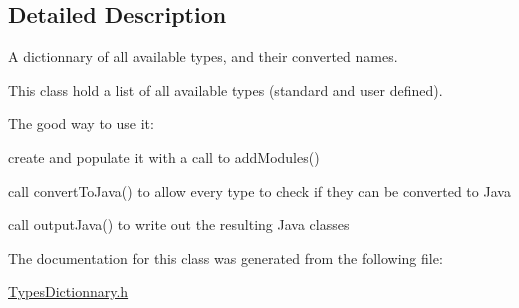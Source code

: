 \subsection{\-Detailed \-Description}
\-A dictionnary of all available types, and their converted names. 

\-This class hold a list of all available types (standard and user defined).

\-The good way to use it\-:
\begin{DoxyItemize}
\item create and populate it with a call to add\-Modules()
\item call convert\-To\-Java() to allow every type to check if they can be converted to \-Java
\item call output\-Java() to write out the resulting \-Java classes 
\end{DoxyItemize}

\-The documentation for this class was generated from the following file\-:\begin{DoxyCompactItemize}
\item 
\hyperlink{TypesDictionnary_8h}{\-Types\-Dictionnary.\-h}\end{DoxyCompactItemize}
